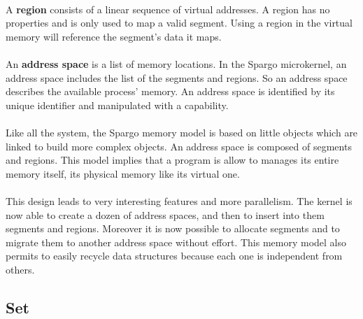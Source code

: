 \documentclass[10pt,a4wide]{article}
\begin{document}
\begin{multicols}{2}
\paragraph{}

A \textbf{region} consists of a linear sequence of virtual addresses.
A region has no properties and is only used to map a valid segment.
Using a region in the virtual memory will reference the segment's data
it maps.

\paragraph{}

An \textbf{address space} is a list of memory locations. In the Spargo
microkernel, an address space includes the list of the segments and regions.
So an address space describes the available process' memory. An address space
is identified by its unique identifier and manipulated with a capability.

\paragraph{}

Like all the system, the Spargo memory model is based on little objects which
are linked to build more complex objects. An address space is composed
of segments and regions. This model implies that a program is allow to
manages its entire memory itself, its physical memory like its virtual one.

\paragraph{}

This design leads to very interesting features and more parallelism.
The kernel is now able to create a dozen of address spaces, and then to
insert into them segments and regions. Moreover it is now possible to allocate
segments and to migrate them to another address space without effort. This
memory model also permits to easily recycle data structures because each one
is independent from others.

\subsection{Set}

\paragraph{}


\end{multicols}
\end{document}
